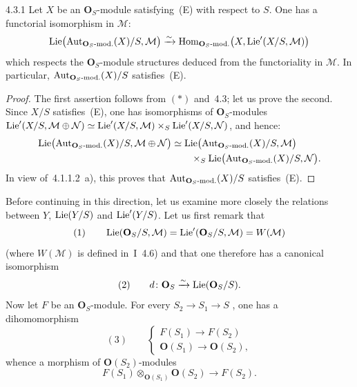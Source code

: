 \begin{corollary}{4.3.1}\label{II.4.3.1}
Let \(X\) be an \(\mathbf{O}_{S}\)-module satisfying~(E) with respect to \(S\).
One has a functorial isomorphism in \(\mathcal{M}\):
\[
\operatorname{Lie}\bigl(\operatorname{Aut}_{\mathbf{O}_{S}\text{-mod.}}(X)/S,\mathcal{M}\bigr)
\xrightarrow{\sim}
\operatorname{Hom}_{\mathbf{O}_{S}\text{-mod.}}\bigl(X,\operatorname{Lie}'(X/S,\mathcal{M})\bigr)
\]
which respects the \(\mathbf{O}_{S}\)-module structures deduced from the
functoriality in \(\mathcal{M}\).
{\renewcommand{\thefootnote}{(63)}}
In particular, \(\operatorname{Aut}_{\mathbf{O}_{S}\text{-mod.}}(X)/S\) satisfies~(E).
\end{corollary}

\begin{proof}
The first assertion follows from \((*)\) and~4.3; let us prove the second.
Since \(X/S\) satisfies~(E), one has isomorphisms of
\(\mathbf{O}_{S}\)-modules
\(\operatorname{Lie}'(X/S,\mathcal{M}\oplus\mathcal{N})
\simeq
\operatorname{Lie}'(X/S,\mathcal{M})\times_{S}\operatorname{Lie}'(X/S,\mathcal{N})\), and hence:
\begin{align*}
\operatorname{Lie}\bigl(\operatorname{Aut}_{\mathbf{O}_{S}\text{-mod.}}(X)/S,\mathcal{M}\oplus\mathcal{N}\bigr)
&\simeq
\operatorname{Lie}\bigl(\operatorname{Aut}_{\mathbf{O}_{S}\text{-mod.}}(X)/S,\mathcal{M}\bigr)\\
&\qquad\times_{S}
\operatorname{Lie}\bigl(\operatorname{Aut}_{\mathbf{O}_{S}\text{-mod.}}(X)/S,\mathcal{N}\bigr).
\end{align*}
In view of~4.1.1.2~a), this proves that
\(\operatorname{Aut}_{\mathbf{O}_{S}\text{-mod.}}(X)/S\) satisfies~(E).
\end{proof}

\label{II.4.3.2}
Before continuing in this direction, let us examine more closely the
relations between \(Y\), \(\operatorname{Lie}(Y/S)\) and \(\operatorname{Lie}'(Y/S)\). Let us first
remark that
\[
(1)\qquad
\operatorname{Lie}(\mathbf{O}_{S}/S,\mathcal{M})
=
\operatorname{Lie}'(\mathbf{O}_{S}/S,\mathcal{M})
=
W(\mathcal{M})
\]
(where \(W(\mathcal{M})\) is defined in~I~4.6) and that one therefore has a
canonical isomorphism
\[
(2)\qquad
d\colon\mathbf{O}_{S}\xrightarrow{\sim}\operatorname{Lie}(\mathbf{O}_{S}/S).
\]
Now let \(F\) be an \(\mathbf{O}_{S}\)-module. For every
\(S_{2}\to S_{1}\to S\)
{\renewcommand{\thefootnote}{(64)}}, one has a dihomomorphism
\[
(3)\qquad
\begin{cases}
F(S_{1})\to F(S_{2})\\
\mathbf{O}(S_{1})\to\mathbf{O}(S_{2}),
\end{cases}
\]
whence a morphism of \(\mathbf{O}(S_{2})\)-modules
\[
F(S_{1})\otimes_{\mathbf{O}(S_{1})}\mathbf{O}(S_{2})\longrightarrow F(S_{2}).
\]

